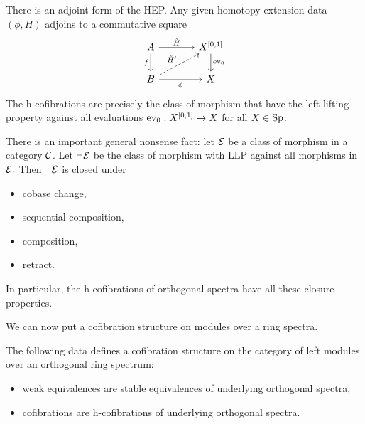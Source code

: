 There is an adjoint form of the HEP. Any given homotopy extension data $(\phi,H)$ adjoins to a commutative square
\[
\begin{tikzcd}[column sep=large]
A \arrow[r, "\tilde{H}"] \arrow[d, "f", swap] & {X^{[0,1]}} \arrow[d, "\ev_0"]\\
B \arrow[ur, "\tilde{H}'", dashed] \arrow[r, "\phi", swap] & X
\end{tikzcd}
\]
The h-cofibrations are precisely the class of morphism that have the left lifting property against all evaluations $\operatorname{ev}_0:X^{[0,1]}\to X$ for all $X\in{\normalfont\textup{Sp}}$.

\begin{exercise}[AT2Sheet6.1]
There is an important general nonsense fact: let $\mathcal{E}$ be a class of morphism in a category $\mathcal{C}$. Let $^\perp\mathcal{E}$ be the class of morphism with LLP against all morphisms in $\mathcal{E}.$
Then $^\perp\mathcal{E}$ is closed under
\begin{itemize}
    \item cobase change,
    \item sequential composition,
    \item composition,
    \item retract.
\end{itemize}
In particular, the h-cofibrations of orthogonal spectra have all these closure properties.
\end{exercise}

We can now put a cofibration structure on modules over a ring spectra.

\begin{theorem}\label{theorem:cofibration-structure-on-modules-over-a-ring-spectra}
The following data defines a cofibration structure on the category of left modules over an orthogonal ring spectrum:
\begin{itemize}
    \item weak equivalences are stable equivalences of underlying orthogonal spectra,
    \item cofibrations are h-cofibrations of underlying orthogonal spectra.
\end{itemize}
\end{theorem}

